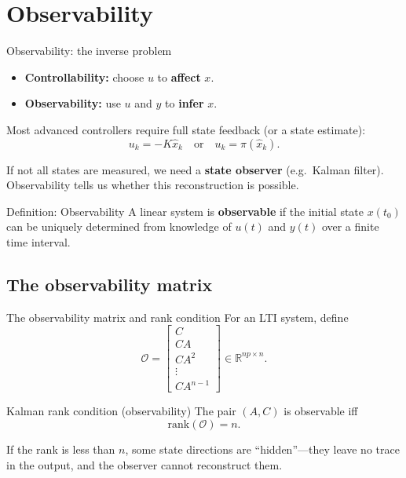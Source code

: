 \documentclass[aspectratio=169,10pt]{beamer}
\newcommand{\R}{\mathbb{R}}
\newcommand{\Ocal}{\mathcal{O}}
\begin{document}
\section{Observability}

\begin{frame}{Observability: the inverse problem}
\begin{itemize}
  \item \textbf{Controllability:} choose $u$ to \textbf{affect} $x$.
  \item \textbf{Observability:} use $u$ and $y$ to \textbf{infer} $x$.
\end{itemize}

Most advanced controllers require full state feedback (or a state
estimate):
\[
u_k = -K\hat{x}_k
\quad\text{or}\quad
u_k = \pi(\hat{x}_k).
\]

If not all states are measured, we need a \textbf{state observer} (e.g.\
Kalman filter).
Observability tells us whether this reconstruction is possible.

\begin{defnbox}{Definition: Observability}
A linear system is \textbf{observable} if the initial state $x(t_0)$ can
be uniquely determined from knowledge of $u(t)$ and $y(t)$ over a finite
time interval.
\end{defnbox}
\end{frame}

\subsection{The observability matrix}

\begin{frame}{The observability matrix and rank condition}
For an LTI system, define
\[
\Ocal=
\begin{bmatrix}
C\\ CA\\ CA^2\\ \vdots\\ CA^{n-1}
\end{bmatrix}
\in\R^{np\times n}.
\]

\begin{alertbox}{Kalman rank condition (observability)}
The pair $(A,C)$ is observable iff
\[
\mathrm{rank}(\Ocal)=n.
\]
\end{alertbox}

If the rank is less than $n$, some state directions are ``hidden''---they
leave no trace in the output, and the observer cannot reconstruct them.
\end{frame}
\end{document}
